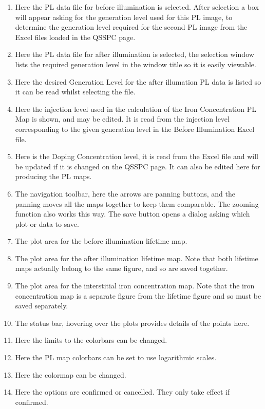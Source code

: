 \documentclass[final,a4paper,oneside,12pt]{article}
\begin{document}
\begin{enumerate}
\item Here the PL data file for before illumination is selected. After selection a box will appear asking for the generation level used for this PL image, to determine the generation level required for the second PL image from the Excel files loaded in the QSSPC page.
\item Here the PL data file for after illumination is selected, the selection window lists the required generation level in the window title so it is easily viewable.
\item  Here the desired Generation Level for the after illumation PL data is listed so it can be read whilst selecting the file.
\item Here the injection level used in the calculation of the Iron Concentration PL Map is shown, and may be edited. It is read from the injection level corresponding to the given generation level in the Before Illumination Excel file.
\item Here is the Doping Concentration level, it is read from the Excel file and will be updated if it is changed on the QSSPC page. It can also be edited here for producing the PL maps.
\item The navigation toolbar, here the arrows are panning buttons, and the panning moves all the maps together to keep them comparable. The zooming function also works this way. The save button opens a dialog asking which plot or data to save.
\item The plot area for the before illumination lifetime map.
\item The plot area for the after illumination lifetime map. Note that both lifetime maps actually belong to the same figure, and so are saved together.
\item The plot area for the interstitial iron concentration map. Note that the iron concentration map is a separate figure from the lifetime figure and so must be saved separately.
\item The status bar, hovering over the plots provides details of the points here.
\item Here the limits to the colorbars can be changed.
\item Here the PL map colorbars can be set to use logarithmic scales.
\item Here the colormap can be changed.
\item Here the options are confirmed or cancelled. They only take effect if confirmed.
\end{enumerate}
\end{document}
